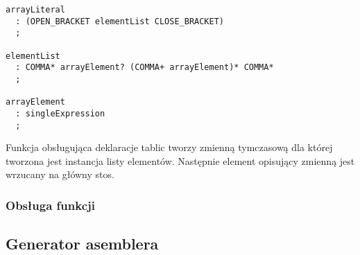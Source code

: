 \begin{lstlisting}[caption=Definicja gramatyki dla deklaracji tablicy z wartościami, label=alg:array1]
arrayLiteral
  : (OPEN_BRACKET elementList CLOSE_BRACKET)
  ;

elementList
  : COMMA* arrayElement? (COMMA+ arrayElement)* COMMA*
  ;

arrayElement
  : singleExpression
  ;
\end{lstlisting}

\par Funkcja obsługująca deklaracje tablic tworzy zmienną tymczasową dla której tworzona jest instancja listy elementów. Następnie element opisujący zmienną jest wrzucany na główny stos.




\subsubsection{Obsługa funkcji}


\subsection{Generator asemblera}
